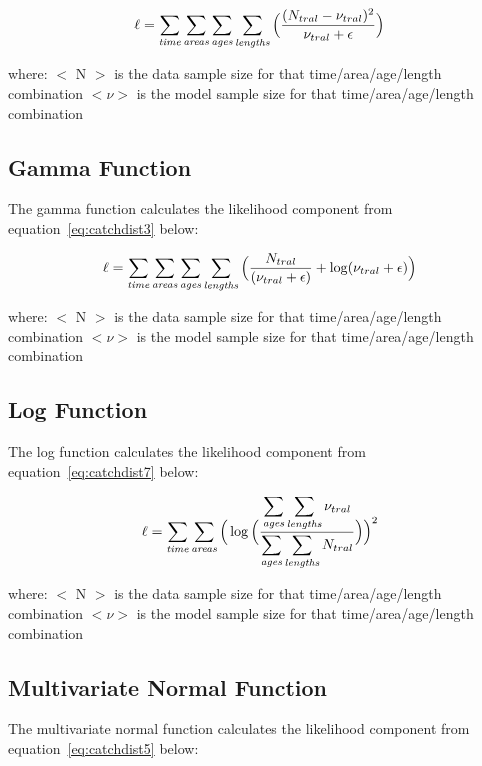 \documentclass[10pt,twoside]{book}
\begin{document}
\begin{equation}\label{eq:catchdist2}
\ell = \sum_{\it time}\sum_{\it areas}\sum_{\it ages}\sum_{\it lengths} \Big( {\frac{ ( N_{tral} - \nu_{tral} ) ^2} {\nu_{tral} + \epsilon}} \Big)
\end{equation}

where:\newline
$<$ N $>$ is the data sample size for that time/area/age/length combination\newline
$<\nu>$ is the model sample size for that time/area/age/length combination

\subsection{Gamma Function}
The gamma function calculates the likelihood component from equation~\ref{eq:catchdist3} below:

\begin{equation}\label{eq:catchdist3}
\ell = \sum_{\it time}\sum_{\it areas}\sum_{\it ages}\sum_{\it lengths} \Big( {\frac{ N_{tral}} { (\nu_{tral} + \epsilon )} + \log ({\nu_{tral} + \epsilon}}) \Big)
\end{equation}

where:\newline
$<$ N $>$ is the data sample size for that time/area/age/length combination\newline
$<\nu>$ is the model sample size for that time/area/age/length combination

\subsection{Log Function}
The log function calculates the likelihood component from equation~\ref{eq:catchdist7} below:

\begin{equation}\label{eq:catchdist7}
\ell = \sum_{\it time}\sum_{\it areas} \Big( \log \Big( {\frac{ \displaystyle \sum_{\it ages}\sum_{\it lengths} \nu_{tral}} { \displaystyle \sum_{\it ages}\sum_{\it lengths} N_{tral}}} \Big) \Big) ^2
\end{equation}

where:\newline
$<$ N $>$ is the data sample size for that time/area/age/length combination\newline
$<\nu>$ is the model sample size for that time/area/age/length combination

\subsection{Multivariate Normal Function}
The multivariate normal function calculates the likelihood component from equation~\ref{eq:catchdist5} below:
\end{document}
